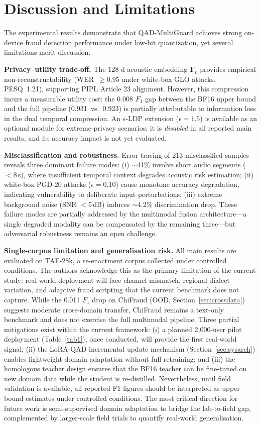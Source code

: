 \documentclass[final,5p,times,number]{elsarticle}
\begin{document}
\section{Discussion and Limitations}\label{sec:discussion}

The experimental results demonstrate that QAD-MultiGuard achieves strong on-device fraud detection performance under low-bit quantization, yet several limitations merit discussion.

\textbf{Privacy--utility trade-off.} The 128-d acoustic embedding $\bm{F}_v$ provides empirical non-reconstructability (WER~$\ge 0.95$ under white-box GLO attacks, PESQ~1.21), supporting PIPL Article 23 alignment. However, this compression incurs a measurable utility cost: the 0.008 $F_1$ gap between the BF16 upper bound and the full pipeline (0.931~vs.~0.923) is partially attributable to information loss in the dual temporal compression. An $\epsilon$-LDP extension ($\epsilon=1.5$) is available as an optional module for extreme-privacy scenarios; it is \emph{disabled} in all reported main results, and its accuracy impact is not yet evaluated.

\textbf{Misclassification and robustness.} Error tracing of 213 misclassified samples reveals three dominant failure modes: (i) $\sim$41\% involve short audio segments ($<8$\,s), where insufficient temporal context degrades acoustic risk estimation; (ii) white-box PGD-20 attacks ($\epsilon=0.10$) cause monotone accuracy degradation, indicating vulnerability to deliberate input perturbations; (iii) extreme background noise (SNR $<5$\,dB) induces $\sim$4.2\% discrimination drop. These failure modes are partially addressed by the multimodal fusion architecture---a single degraded modality can be compensated by the remaining three---but adversarial robustness remains an open challenge.

\textbf{Single-corpus limitation and generalisation risk.} All main results are evaluated on TAF-28k, a re-enactment corpus collected under controlled conditions. The authors acknowledge this as the primary limitation of the current study: real-world deployment will face channel mismatch, regional dialect variation, and adaptive fraud scripting that the current benchmark does not capture. While the 0.011 $F_1$ drop on ChiFraud (OOD, Section~\ref{sec:crossdata}) suggests moderate cross-domain transfer, ChiFraud remains a text-only benchmark and does not exercise the full multimodal pipeline. Three partial mitigations exist within the current framework: (i) a planned 2{,}000-user pilot deployment (Table~\ref{tab1}), once conducted, will provide the first real-world signal; (ii) the LoRA-QAD incremental update mechanism (Section~\ref{sec:sysarch}) enables lightweight domain adaptation without full retraining; and (iii) the homologous teacher design ensures that the BF16 teacher can be fine-tuned on new domain data while the student is re-distilled. Nevertheless, until field validation is available, all reported F1 figures should be interpreted as upper-bound estimates under controlled conditions. The most critical direction for future work is semi-supervised domain adaptation to bridge the lab-to-field gap, complemented by larger-scale field trials to quantify real-world generalisation.
\end{document}
